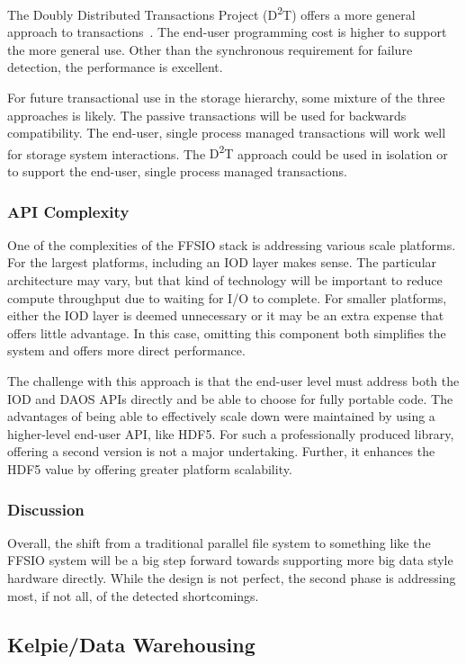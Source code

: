 The Doubly Distributed Transactions Project ({D\textsuperscript{2}T}) offers a
more general approach to
transactions~\cite{lofstead:2012:txn,lofstead:2014:txn}. The end-user
programming cost is higher to support the more general use. Other than the
synchronous requirement for failure detection, the performance is excellent.

For future transactional use in the storage hierarchy, some mixture of the
three approaches is likely. The passive transactions will be used for backwards
compatibility. The end-user, single process managed transactions will work well
for storage system interactions. The {D\textsuperscript{2}T} approach could be used in isolation or
to support the end-user, single process managed transactions.

\subsubsection{API Complexity}
One of the complexities of the FFSIO stack is addressing various scale
platforms. For the largest platforms, including an IOD layer makes sense. The
particular architecture may vary, but that kind of technology will be important
to reduce compute throughput due to waiting for I/O to complete. For smaller
platforms, either the IOD layer is deemed unnecessary or it may be an extra
expense that offers little advantage. In this case, omitting this component
both simplifies the system and offers more direct performance.

The challenge with this approach is that the end-user level must address both
the IOD and DAOS APIs directly and be able to choose for fully portable code.
The advantages of being able to effectively scale down were maintained by using
a higher-level end-user API, like HDF5. For such a professionally produced
library, offering a second version is not a major undertaking. Further, it
enhances the HDF5 value by offering greater platform scalability.

\subsubsection{Discussion}
Overall, the shift from a traditional parallel file system to something like
the FFSIO system will be a big step forward towards supporting more big data
style hardware directly. While the design is not perfect, the second phase is
addressing most, if not all, of the detected shortcomings. 

\subsection{Kelpie/Data Warehousing}

